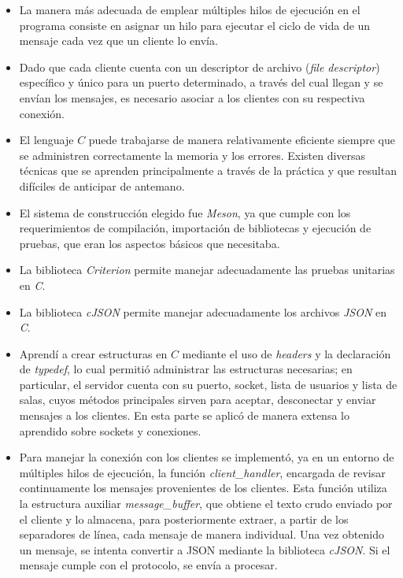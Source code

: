 \documentclass{article}
\begin{document}
    \begin{itemize}
        \item La manera más adecuada de emplear múltiples hilos de ejecución en el programa consiste en asignar un hilo para ejecutar el ciclo de vida de un mensaje cada vez que un cliente lo envía.
        \item Dado que cada cliente cuenta con un descriptor de archivo (\textit{file descriptor}) específico y único para un puerto determinado, a través del cual llegan y se envían los mensajes, es necesario asociar a los clientes con su respectiva conexión.
        \item El lenguaje $C$ puede trabajarse de manera relativamente eficiente siempre que se administren correctamente la memoria y los errores. Existen diversas técnicas que se aprenden principalmente a través de la práctica y que resultan difíciles de anticipar de antemano.
        \item El sistema de construcción elegido fue \textit{Meson}, ya que cumple con los requerimientos de compilación, importación de bibliotecas y ejecución de pruebas, que eran los aspectos básicos que necesitaba.
        \item La biblioteca \textit{Criterion} permite manejar adecuadamente las pruebas unitarias en \textit{C}.
        \item La biblioteca \textit{cJSON} permite manejar adecuadamente los archivos \textit{JSON} en \textit{C}.
        \item Aprendí a crear estructuras en $C$ mediante el uso de \textit{headers} y la declaración de \textit{typedef}, lo cual permitió administrar las estructuras necesarias; en particular, el servidor cuenta con su puerto, socket, lista de usuarios y lista de salas, cuyos métodos principales sirven para aceptar, desconectar y enviar mensajes a los clientes. En esta parte se aplicó de manera extensa lo aprendido sobre sockets y conexiones.
        \item Para manejar la conexión con los clientes se implementó, ya en un entorno de múltiples hilos de ejecución, la función \textit{client\_handler}, encargada de revisar continuamente los mensajes provenientes de los clientes. Esta función utiliza la estructura auxiliar \textit{message\_buffer}, que obtiene el texto crudo enviado por el cliente y lo almacena, para posteriormente extraer, a partir de los separadores de línea, cada mensaje de manera individual. Una vez obtenido un mensaje, se intenta convertir a JSON mediante la biblioteca \textit{cJSON}. Si el mensaje cumple con el protocolo, se envía a procesar.

\end{itemize}
\end{document}

